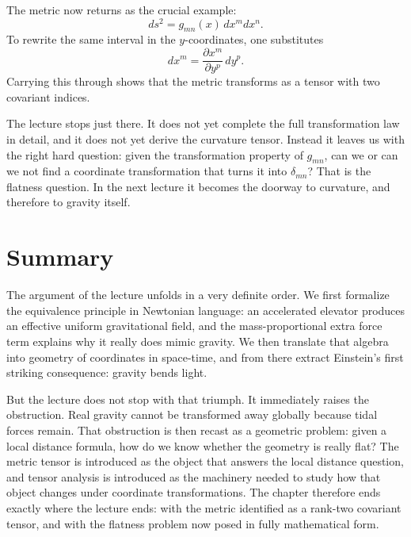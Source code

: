 The metric now returns as the crucial example:
\begin{equation}
ds^2 = g_{mn}(x)\,dx^m dx^n.
\end{equation}
To rewrite the same interval in the \(y\)-coordinates, one substitutes
\begin{equation}
dx^m = \frac{\partial x^m}{\partial y^p}\,dy^p.
\end{equation}
Carrying this through shows that the metric transforms as a tensor with two covariant indices.

The lecture stops just there.  It does not yet complete the full transformation law in detail, and it does not yet derive the curvature tensor.  Instead it leaves us with the right hard question: given the transformation property of \(g_{mn}\), can we or can we not find a coordinate transformation that turns it into \(\delta_{mn}\)?  That is the flatness question.  In the next lecture it becomes the doorway to curvature, and therefore to gravity itself.

\section{Summary}

The argument of the lecture unfolds in a very definite order.  We first formalize the equivalence principle in Newtonian language: an accelerated elevator produces an effective uniform gravitational field, and the mass-proportional extra force term explains why it really does mimic gravity.  We then translate that algebra into geometry of coordinates in space-time, and from there extract Einstein's first striking consequence: gravity bends light.

But the lecture does not stop with that triumph.  It immediately raises the obstruction.  Real gravity cannot be transformed away globally because tidal forces remain.  That obstruction is then recast as a geometric problem: given a local distance formula, how do we know whether the geometry is really flat?  The metric tensor is introduced as the object that answers the local distance question, and tensor analysis is introduced as the machinery needed to study how that object changes under coordinate transformations.  The chapter therefore ends exactly where the lecture ends: with the metric identified as a rank-two covariant tensor, and with the flatness problem now posed in fully mathematical form.
